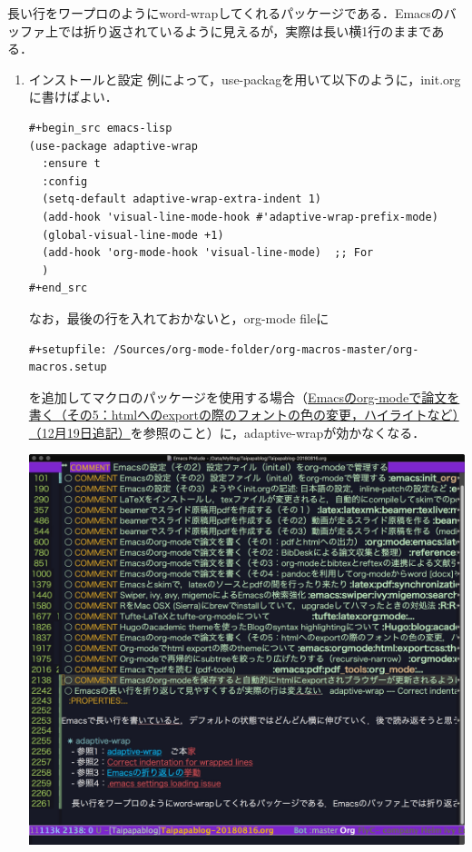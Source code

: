 \documentclass[autodetect-engine,dvipdfmx,12pt,a4paper,ja=standard]{bxjsarticle}
\begin{document}
長い行をワープロのようにword-wrapしてくれるパッケージである．Emacsのバッファ上では折り返されているように見えるが，実際は長い横1行のままである．

\begin{enumerate}
\item インストールと設定
\label{sec:orga649958}
例によって，use-packagを用いて以下のように，init.orgに書けばよい．
\begin{verbatim}
#+begin_src emacs-lisp
(use-package adaptive-wrap
  :ensure t
  :config
  (setq-default adaptive-wrap-extra-indent 1)
  (add-hook 'visual-line-mode-hook #'adaptive-wrap-prefix-mode)
  (global-visual-line-mode +1)
  (add-hook 'org-mode-hook 'visual-line-mode)  ;; For
  )
#+end_src
\end{verbatim}

なお，最後の行を入れておかないと，org-mode fileに

\begin{verbatim}
#+setupfile: /Sources/org-mode-folder/org-macros-master/org-macros.setup
\end{verbatim}

を追加してマクロのパッケージを使用する場合（\href{../html_export}{Emacsのorg-modeで論文を書く（その5：htmlへのexportの際のフォントの色の変更，ハイライトなど）（12月19日追記）}を参照のこと）に，adaptive-wrapが効かなくなる．

\includegraphics[width=.9\linewidth]{./static/img/Before_adaptive.jpg}


\end{enumerate}
\end{document}
